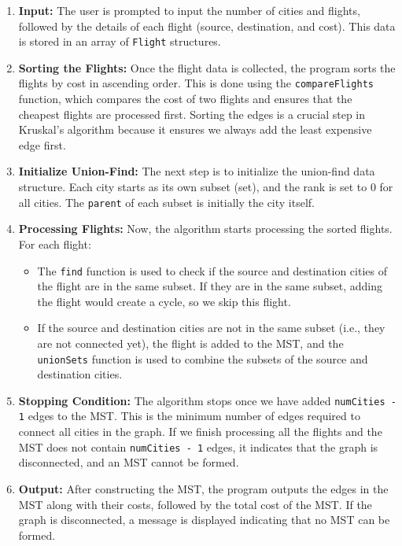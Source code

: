 \documentclass{book}
\begin{document}
\begin{enumerate}
    \item \textbf{Input:} 
    The user is prompted to input the number of cities and flights, followed by the details of each flight (source, destination, and cost). This data is stored in an array of \texttt{Flight} structures.
    
    \item \textbf{Sorting the Flights:}
    Once the flight data is collected, the program sorts the flights by cost in ascending order. This is done using the \texttt{compareFlights} function, which compares the cost of two flights and ensures that the cheapest flights are processed first. Sorting the edges is a crucial step in Kruskal’s algorithm because it ensures we always add the least expensive edge first.
    
    \item \textbf{Initialize Union-Find:}
    The next step is to initialize the union-find data structure. Each city starts as its own subset (set), and the rank is set to 0 for all cities. The \texttt{parent} of each subset is initially the city itself.
    
    \item \textbf{Processing Flights:}
    Now, the algorithm starts processing the sorted flights. For each flight:
    \begin{itemize}
        \item The \texttt{find} function is used to check if the source and destination cities of the flight are in the same subset. If they are in the same subset, adding the flight would create a cycle, so we skip this flight.
        \item If the source and destination cities are not in the same subset (i.e., they are not connected yet), the flight is added to the MST, and the \texttt{unionSets} function is used to combine the subsets of the source and destination cities.
    \end{itemize}

    \item \textbf{Stopping Condition:}
    The algorithm stops once we have added \texttt{numCities - 1} edges to the MST. This is the minimum number of edges required to connect all cities in the graph. If we finish processing all the flights and the MST does not contain \texttt{numCities - 1} edges, it indicates that the graph is disconnected, and an MST cannot be formed.
    
    \item \textbf{Output:}
    After constructing the MST, the program outputs the edges in the MST along with their costs, followed by the total cost of the MST. If the graph is disconnected, a message is displayed indicating that no MST can be formed.
\end{enumerate}
\end{document}
